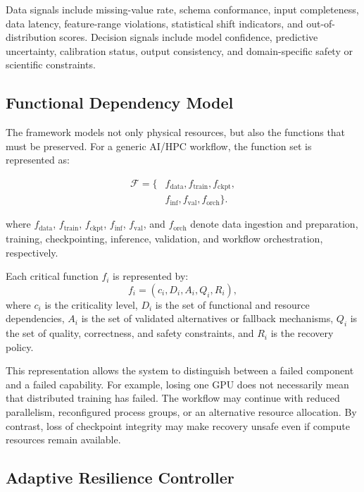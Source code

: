 \documentclass[conference]{IEEEtran}
\begin{document}
Data signals include missing-value rate, schema conformance, input completeness, data latency, feature-range violations, statistical shift indicators, and out-of-distribution scores. Decision signals include model confidence, predictive uncertainty, calibration status, output consistency, and domain-specific safety or scientific constraints.

\subsection{Functional Dependency Model}

The framework models not only physical resources, but also the functions that must be preserved. For a generic AI/HPC workflow, the function set is represented as:

\begin{equation}
\begin{aligned}
\mathcal{F} = \{
& f_{\mathrm{data}},
f_{\mathrm{train}},
f_{\mathrm{ckpt}}, \\
& f_{\mathrm{inf}},
f_{\mathrm{val}},
f_{\mathrm{orch}}
\}.
\end{aligned}
\label{eq:function-set}
\end{equation}

where $f_{\mathrm{data}}$, $f_{\mathrm{train}}$,
$f_{\mathrm{ckpt}}$, $f_{\mathrm{inf}}$,
$f_{\mathrm{val}}$, and $f_{\mathrm{orch}}$ denote data ingestion and
preparation, training, checkpointing, inference, validation, and workflow
orchestration, respectively.

Each critical function $f_i$ is represented by:
\begin{equation}
f_i = (c_i, D_i, A_i, Q_i, R_i),
\end{equation}
where $c_i$ is the criticality level, $D_i$ is the set of functional and resource dependencies, $A_i$ is the set of validated alternatives or fallback mechanisms, $Q_i$ is the set of quality, correctness, and safety constraints, and $R_i$ is the recovery policy.

This representation allows the system to distinguish between a failed component and a failed capability. For example, losing one GPU does not necessarily mean that distributed training has failed. The workflow may continue with reduced parallelism, reconfigured process groups, or an alternative resource allocation. By contrast, loss of checkpoint integrity may make recovery unsafe even if compute resources remain available.

\subsection{Adaptive Resilience Controller}
\end{document}
